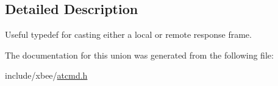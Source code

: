 \subsection{Detailed Description}
Useful typedef for casting either a local or remote response frame. 

The documentation for this union was generated from the following file\+:\begin{DoxyCompactItemize}
\item 
include/xbee/\hyperlink{atcmd_8h}{atcmd.\+h}\end{DoxyCompactItemize}
